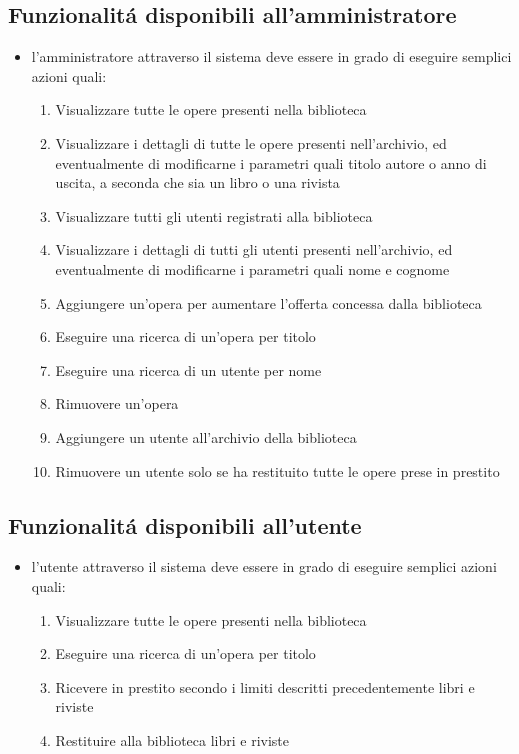 \documentclass[10pt]{article}
\begin{document}
\subsection{Funzionalit\'a disponibili all'amministratore}
\begin{itemize}
\item l'amministratore attraverso il sistema deve essere in grado di eseguire semplici azioni quali:
		\begin{enumerate}
		\item Visualizzare tutte le opere presenti nella biblioteca
		\item Visualizzare i dettagli di tutte le opere presenti nell'archivio, ed eventualmente di modificarne i parametri quali titolo autore o anno di uscita, a 					seconda che sia un libro o una rivista
		\item Visualizzare tutti gli utenti registrati alla biblioteca
		\item Visualizzare i dettagli di tutti gli utenti presenti nell'archivio, ed eventualmente di modificarne i parametri quali nome e cognome
		\item Aggiungere un'opera per aumentare l'offerta concessa dalla biblioteca
		\item Eseguire una ricerca di un'opera per titolo
		\item Eseguire una ricerca di un utente per nome
		\item Rimuovere un'opera 
		\item Aggiungere un utente all'archivio della biblioteca
		\item Rimuovere un utente solo se ha restituito tutte le opere prese in prestito
		\end{enumerate}
\end{itemize}

\subsection{Funzionalit\'a disponibili all'utente}
\begin{itemize}
\item l'utente attraverso il sistema deve essere in grado di eseguire semplici azioni quali:
		\begin{enumerate}
		\item Visualizzare tutte le opere presenti nella biblioteca
		\item Eseguire una ricerca di un'opera per titolo
		\item Ricevere in prestito secondo i limiti descritti precedentemente libri e riviste
		\item Restituire alla biblioteca libri e riviste
		\end{enumerate}
\end{itemize}
\end{document}
